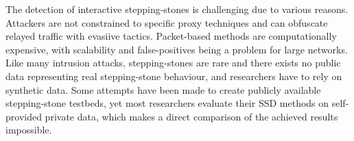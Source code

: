 \documentclass[runningheads,11pt]{llncs}\usepackage[]{graphicx}\usepackage[]{color}
\begin{document}










The detection of interactive stepping-stones is challenging due to various reasons. Attackers are not constrained to specific proxy techniques and can obfuscate relayed traffic with  evasiive tactics. Packet-based methods are computationally expensive, with scalability and false-positives being a problem for large networks. Like many intrusion attacks, stepping-stones are rare and there exists no public data representing real stepping-stone behaviour, and researchers have to rely on synthetic data. Some attempts have been made to create publicly available stepping-stone testbeds, yet most researchers evaluate their SSD methods on self-provided private data, which makes a direct comparison of the achieved results impossible. 
\end{document}
